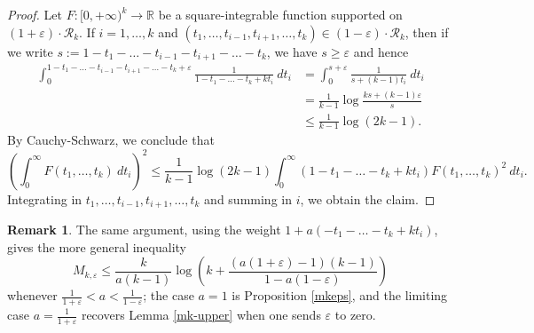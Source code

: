 \documentclass{bmcart}
\theoremstyle{plain}
\theoremstyle{definition}
\newtheorem{remark}[theorem]{Remark}
\newcommand\R{\mathbb{R}}
\newcommand\eps{\varepsilon}
\begin{document}
\begin{proof}  
Let $F: [0,+\infty)^k \to \R$ be a square-integrable function supported on $(1+\eps) \cdot {\mathcal R}_k$.  If $i=1,\dots,k$ and $(t_1,\dots,t_{i-1},t_{i+1},\dots,t_k) \in (1-\eps) \cdot {\mathcal R}_k$, then if we write $s := 1-t_1-\dots-t_{i-1}-t_{i+1}-\dots-t_k$, we have $s \geq \eps$ and hence
\begin{align*}
\int_0^{1-t_1-\dots-t_{i-1}-t_{i+1}-\dots-t_k+\eps} \frac{1}{1-t_1-\dots-t_k + kt_i}\ dt_i 
&= \int_0^{s+\eps} \frac{1}{s+(k-1)t_i}\ dt_i \\
&= \frac{1}{k-1} \log \frac{ks + (k-1)\eps}{s} \\
&\leq \frac{1}{k-1} \log(2k-1).
\end{align*}
By Cauchy-Schwarz, we conclude that
$$ \left(\int_0^\infty F(t_1,\dots,t_k)\ dt_i\right)^2 \leq \frac{1}{k-1} \log(2k-1) \int_0^\infty (1-t_1-\dots-t_k + k t_i) F(t_1,\dots,t_k)^2\ dt_i.$$
Integrating in $t_1,\dots,t_{i-1},t_{i+1},\dots,t_k$ and summing in $i$, we obtain the claim.
\end{proof}

\begin{remark} The same argument, using the weight $1 + a(-t_1-\dots-t_k + kt_i)$, gives the more general inequality
$$ M_{k,\eps} \leq \frac{k}{a(k-1)} \log\left(k + \frac{(a(1+\eps)-1)(k-1)}{1-a(1-\eps)} \right)$$
whenever $\frac{1}{1+\eps} < a < \frac{1}{1-\eps}$; the case $a=1$ is Proposition \ref{mkeps}, and the limiting case $a=\frac{1}{1+\eps}$ recovers Lemma \ref{mk-upper} when one sends $\eps$ to zero.
\end{remark}
\end{document}
